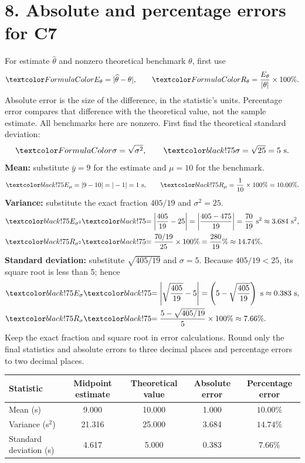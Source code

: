 \section*{8. Absolute and percentage errors for C7}
For estimate $\widehat\theta$ and nonzero theoretical benchmark $\theta$, first use
\[
\fm{E_\theta=|\widehat\theta-\theta|},\qquad
\fm{R_\theta=\frac{E_\theta}{|\theta|}\times100\%}.
\]
Absolute error is the size of the difference, in the statistic's units.
Percentage error compares that difference with the theoretical value, not the
sample estimate. All benchmarks here are nonzero. First find the theoretical
standard deviation:
\[
\fm{\sigma=\sqrt{\sigma^2}},\qquad\su{\sigma=\sqrt{25}=5\text{ s}}.
\]
\textbf{Mean:} substitute $\bar y=9$ for the estimate and $\mu=10$ for the benchmark.
\[
\su{E_\mu=|9-10|=|-1|=1\text{ s}},\qquad
\su{R_\mu=\frac{1}{10}\times100\%=10.00\%}.
\]
\textbf{Variance:} substitute the exact fraction $405/19$ and $\sigma^2=25$.
\[
\begin{aligned}
\su{E_{\sigma^2}}&\su{=\left|\frac{405}{19}-25\right|
=\left|\frac{405-475}{19}\right|=\frac{70}{19}\text{ s}^2
\approx3.684\text{ s}^2},\\
\su{R_{\sigma^2}}&\su{=\frac{70/19}{25}\times100\%
=\frac{280}{19}\%\approx14.74\%}.
\end{aligned}
\]
\textbf{Standard deviation:} substitute $\sqrt{405/19}$ and $\sigma=5$.
Because $405/19<25$, its square root is less than 5; hence
\[
\begin{aligned}
\su{E_\sigma}&\su{=\left|\sqrt{\frac{405}{19}}-5\right|
=\left(5-\sqrt{\frac{405}{19}}\right)\text{ s}\approx0.383\text{ s}},\\
\su{R_\sigma}&\su{=\frac{5-\sqrt{405/19}}{5}\times100\%
\approx7.66\%}.
\end{aligned}
\]
Keep the exact fraction and square root in error calculations. Round only the
final statistics and absolute errors to three decimal places and percentage
errors to two decimal places.
\begin{center}
\begin{tabular}{|l|c|c|c|c|}\hline
Statistic&Midpoint estimate&Theoretical value&Absolute error&Percentage error\\\hline
Mean (s)&9.000&10.000&1.000&$10.00\%$\\\hline
Variance (s$^2$)&21.316&25.000&3.684&$14.74\%$\\\hline
Standard deviation (s)&4.617&5.000&0.383&$7.66\%$\\\hline
\end{tabular}
\end{center}
\newpage
\vspace*{-15mm}
